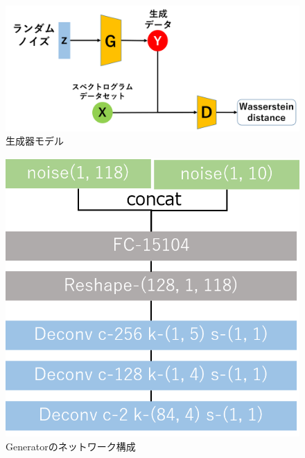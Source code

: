 \begin{figure}[htbp]
	\begin{center}
		\includegraphics[scale=0.58]{./images/generate-model/proposed_gan.png}
		\caption{生成器モデル}
		\label{fig:proposedgan}
	\end{center}
\end{figure}

\begin{figure}[htbp]
	\begin{center}
		\includegraphics[scale=0.7]{./images/generate-model/generator.png}
		\caption{Generatorのネットワーク構成}
		\label{fig:network-gan-gen}
	\end{center}
\end{figure}

